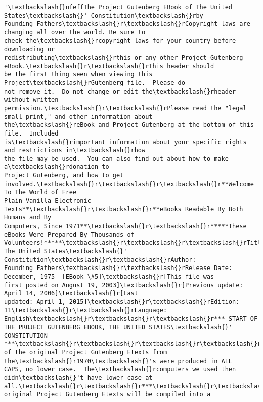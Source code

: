\documentclass[11pt]{article}
\makeatletter
\newcommand{\boxspacing}{\kern\kvtcb@left@rule\kern\kvtcb@boxsep}
\newcommand{\prompt}[4]{
        \ttfamily\llap{{\color{#2}[#3]:\hspace{3pt}#4}}\vspace{-\baselineskip}
    }
\makeatother
\begin{document}
            \begin{tcolorbox}[breakable, size=fbox, boxrule=.5pt, pad at break*=1mm, opacityfill=0]
\prompt{Out}{outcolor}{3}{\boxspacing}
\begin{Verbatim}[commandchars=\\\{\}]
'\textbackslash{}ufeffThe Project Gutenberg EBook of The United States\textbackslash{}' Constitution\textbackslash{}rby
Founding Fathers\textbackslash{}r\textbackslash{}rCopyright laws are changing all over the world. Be sure to
check the\textbackslash{}rcopyright laws for your country before downloading or
redistributing\textbackslash{}rthis or any other Project Gutenberg eBook.\textbackslash{}r\textbackslash{}rThis header should
be the first thing seen when viewing this Project\textbackslash{}rGutenberg file.  Please do
not remove it.  Do not change or edit the\textbackslash{}rheader without written
permission.\textbackslash{}r\textbackslash{}rPlease read the "legal small print," and other information about
the\textbackslash{}reBook and Project Gutenberg at the bottom of this file.  Included
is\textbackslash{}rimportant information about your specific rights and restrictions in\textbackslash{}rhow
the file may be used.  You can also find out about how to make a\textbackslash{}rdonation to
Project Gutenberg, and how to get involved.\textbackslash{}r\textbackslash{}r\textbackslash{}r**Welcome To The World of Free
Plain Vanilla Electronic Texts**\textbackslash{}r\textbackslash{}r**eBooks Readable By Both Humans and By
Computers, Since 1971**\textbackslash{}r\textbackslash{}r*****These eBooks Were Prepared By Thousands of
Volunteers!*****\textbackslash{}r\textbackslash{}r\textbackslash{}rTitle: The United States\textbackslash{}' Constitution\textbackslash{}r\textbackslash{}rAuthor:
Founding Fathers\textbackslash{}r\textbackslash{}rRelease Date: December, 1975  [EBook \#5]\textbackslash{}r[This file was
first posted on August 19, 2003]\textbackslash{}r[Previous update: April 14, 2006]\textbackslash{}r[Last
updated: April 1, 2015]\textbackslash{}r\textbackslash{}rEdition: 11\textbackslash{}r\textbackslash{}rLanguage: English\textbackslash{}r\textbackslash{}r\textbackslash{}r*** START OF
THE PROJECT GUTENBERG EBOOK, THE UNITED STATES\textbackslash{}' CONSTITUTION ***\textbackslash{}r\textbackslash{}r\textbackslash{}r\textbackslash{}r\textbackslash{}rAll
of the original Project Gutenberg Etexts from the\textbackslash{}r1970\textbackslash{}'s were produced in ALL
CAPS, no lower case.  The\textbackslash{}rcomputers we used then didn\textbackslash{}'t have lower case at
all.\textbackslash{}r\textbackslash{}r***\textbackslash{}r\textbackslash{}rThese original Project Gutenberg Etexts will be compiled into a

\end{Verbatim}
\end{tcolorbox}
\end{document}
